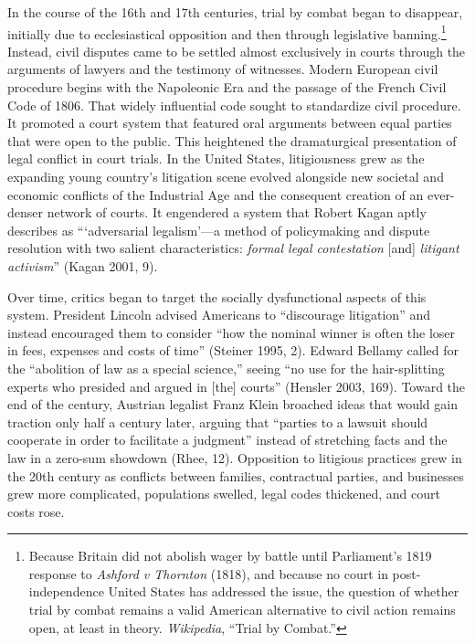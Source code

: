 In the course of the 16th and 17th centuries, trial by combat began to disappear, initially due to ecclesiastical opposition and then through legislative banning.\footnote{Because Britain did not abolish wager by battle until Parliament's 1819 response to \emph{Ashford v Thornton} (1818), and because no court in post-independence United States has addressed the issue, the question of whether trial by combat remains a valid American alternative to civil action remains open, at least in theory.  \emph{Wikipedia}, ``Trial by Combat.''} Instead, civil disputes came to be settled almost exclusively in courts through the arguments of lawyers and the testimony of witnesses. Modern European civil procedure begins with the Napoleonic Era and the passage of the French Civil Code of 1806. That widely influential code sought to standardize civil procedure. It promoted a court system that featured oral arguments between equal parties that were open to the public. This heightened the dramaturgical presentation of legal conflict in court trials. In the United States, litigiousness grew as the expanding young country's litigation scene evolved alongside new societal and economic conflicts of the Industrial Age and the consequent creation of an ever-denser network of courts. It engendered a system that Robert Kagan aptly describes as ```adversarial legalism'---a method of policymaking and dispute resolution with two salient characteristics: \emph{formal legal contestation} [and] \emph{litigant activism}'' (Kagan 2001, 9). 

Over time, critics began to target the socially dysfunctional aspects of this system. President Lincoln advised Americans to ``discourage litigation'' and instead encouraged them to consider ``how the nominal winner is often the loser in fees, expenses and costs of time'' (Steiner 1995, 2). Edward Bellamy called for the ``abolition of law as a special science,'' seeing ``no use for the hair-splitting experts who presided and argued in [the] courts'' (Hensler 2003, 169). Toward the end of the century, Austrian legalist Franz Klein broached ideas that would gain traction only half a century later, arguing that ``parties to a lawsuit should cooperate in order to facilitate a judgment'' instead of stretching facts and the law in a zero-sum showdown (Rhee, 12). Opposition to litigious practices grew in the 20th century as conflicts between families, contractual parties, and businesses grew more complicated, populations swelled, legal codes thickened, and court costs rose. 

